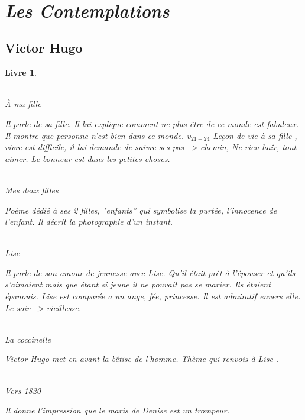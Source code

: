 \documentclass[12pt,a4paper]{article}
\newtheorem{li}{Livre}
\begin{document}
\setcounter{tocdepth}{3}								%
\renewcommand{\contentsname}{Sommaire}					%
\tableofcontents										%
\\ \newpage

\section {\textit{Les Contemplations}}
	\subsection{Victor Hugo}
\begin{li} \\

~~
\\ \textsc{}
{\selectfont 
\`A ma fille\par
	Il parle de sa fille.
	Il lui explique comment ne plus être de ce monde est fabuleux.
	Il montre que personne n'est bien dans ce monde.
	$v_{21-24}$ Leçon de vie à sa fille , vivre est difficile, il lui demande de suivre ses pas --> chemin, Ne rien haîr, tout aimer.
	Le bonneur est dans les petites choses.\\ \\
}
	\textsc{}
	{\selectfont
	Mes deux filles\par
	Poème dédié à ses 2 filles, "enfants'' qui symbolise la purtée, l'innocence de l'enfant.
	Il décrit la photographie d'un instant.\\ \\
}
	\textsc{}
	{\selectfont
	Lise\par
	Il parle de son amour de jeunesse avec Lise.
	Qu'il était prêt à l'épouser et qu'ils s'aimaient mais que étant si jeune il ne pouvait pas se marier. Ils étaient épanouis.
	Lise est comparée a un ange, fée, princesse.
	Il est admiratif envers elle. Le soir --> vieillesse.\\ \\
}
	\textsc{}
	{\selectfont
	La coccinelle\par
	Victor Hugo met en avant la bêtise de l'homme.
	Thème qui renvois à Lise .\\ \\
}
	\textsc{}
	{\selectfont
	Vers 1820\par
	Il donne l'impression que le maris de Denise est un trompeur. \\ \\
}
\end{li}
\end{document}
